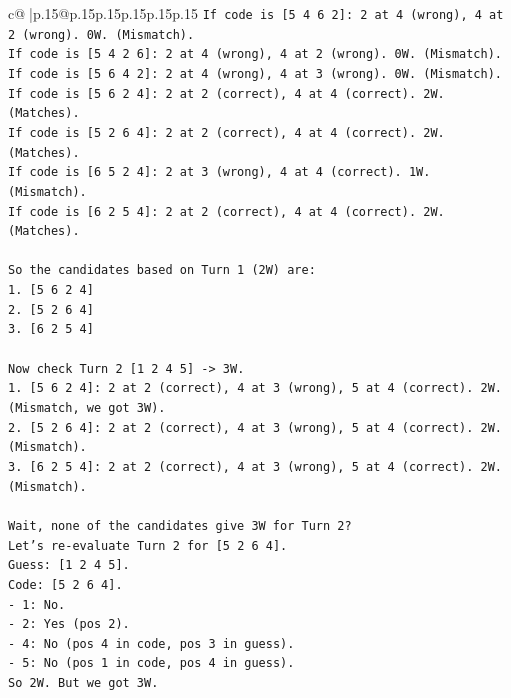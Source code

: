 \documentclass{article}
\begin{document}
{\begin{supertabular}{c@{$\;$}|p{.15\linewidth}@{}p{.15\linewidth}p{.15\linewidth}p{.15\linewidth}p{.15\linewidth}p{.15\linewidth}}
{{{\texttt{If code is {[}5 4 6 2{]}: 2 at 4 (wrong), 4 at 2 (wrong). 0W. (Mismatch).} \\
\texttt{If code is {[}5 4 2 6{]}: 2 at 4 (wrong), 4 at 2 (wrong). 0W. (Mismatch).} \\
\texttt{If code is {[}5 6 4 2{]}: 2 at 4 (wrong), 4 at 3 (wrong). 0W. (Mismatch).} \\
\texttt{If code is {[}5 6 2 4{]}: 2 at 2 (correct), 4 at 4 (correct). 2W. (Matches).} \\
\texttt{If code is {[}5 2 6 4{]}: 2 at 2 (correct), 4 at 4 (correct). 2W. (Matches).} \\
\texttt{If code is {[}6 5 2 4{]}: 2 at 3 (wrong), 4 at 4 (correct). 1W. (Mismatch).} \\
\texttt{If code is {[}6 2 5 4{]}: 2 at 2 (correct), 4 at 4 (correct). 2W. (Matches).} \\
\\ 
\texttt{So the candidates based on Turn 1 (2W) are:} \\
\texttt{1. {[}5 6 2 4{]}} \\
\texttt{2. {[}5 2 6 4{]}} \\
\texttt{3. {[}6 2 5 4{]}} \\
\\ 
\texttt{Now check Turn 2 {[}1 2 4 5{]} {-}> 3W.} \\
\texttt{1. {[}5 6 2 4{]}: 2 at 2 (correct), 4 at 3 (wrong), 5 at 4 (correct). 2W. (Mismatch, we got 3W).} \\
\texttt{2. {[}5 2 6 4{]}: 2 at 2 (correct), 4 at 3 (wrong), 5 at 4 (correct). 2W. (Mismatch).} \\
\texttt{3. {[}6 2 5 4{]}: 2 at 2 (correct), 4 at 3 (wrong), 5 at 4 (correct). 2W. (Mismatch).} \\
\\ 
\texttt{Wait, none of the candidates give 3W for Turn 2?} \\
\texttt{Let's re{-}evaluate Turn 2 for {[}5 2 6 4{]}.} \\
\texttt{Guess: {[}1 2 4 5{]}.} \\
\texttt{Code: {[}5 2 6 4{]}.} \\
\texttt{{-} 1: No.} \\
\texttt{{-} 2: Yes (pos 2).} \\
\texttt{{-} 4: No (pos 4 in code, pos 3 in guess).} \\
\texttt{{-} 5: No (pos 1 in code, pos 4 in guess).} \\
\texttt{So 2W. But we got 3W.} \\
\\ 
}}}
\end{supertabular}}
\end{document}
